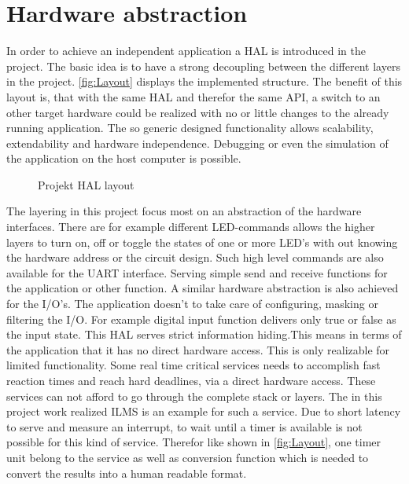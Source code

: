 \chapter{Hardware abstraction}
In order to achieve an independent application a \ac{HAL} is introduced in the project. The basic idea is to have a strong decoupling between the different layers in the project. \autoref{fig:Layout} displays the implemented structure. The benefit of this layout is, that with the same \ac{HAL} and therefor the same \ac{API}, a switch to an other target hardware could be realized with no or little changes to the already running application. The so generic designed functionality allows scalability, extendability and hardware independence. Debugging or even the simulation of the application on the host computer is possible.\\
\begin{figure}[H]
		\begin{center}
			
		\end{center}
		\caption{Projekt \acs{HAL} layout}
		\label{fig:Layout}
\end{figure}
The layering in this project focus most on an abstraction of the hardware interfaces. There are for example different LED-commands allows the higher layers to turn on, off or toggle the states of one or more LED's with out knowing the hardware address or the circuit design. Such high level commands are also available for the \ac{UART} interface. Serving simple send and receive functions for the application or other function. A similar hardware abstraction is also achieved for the I/O's. The application doesn't to take care of configuring, masking or filtering the I/O. For example digital input function delivers only true or false as the input state. 
This \ac{HAL} serves strict information hiding.This means in terms of the application that it has no direct hardware access. This is only realizable for limited functionality. Some real time critical services needs to accomplish fast reaction times and reach hard deadlines, via a direct hardware access. These services can not afford to go through the complete stack or layers. The in this project work realized \ac{ILMS} is an example for such a service. Due to short latency to serve and measure an interrupt, to wait until a timer is available is not possible for this kind of service. Therefor like shown in \autoref{fig:Layout}, one timer unit belong to the service as well as conversion function which is needed to convert the results into a human readable format.\\

